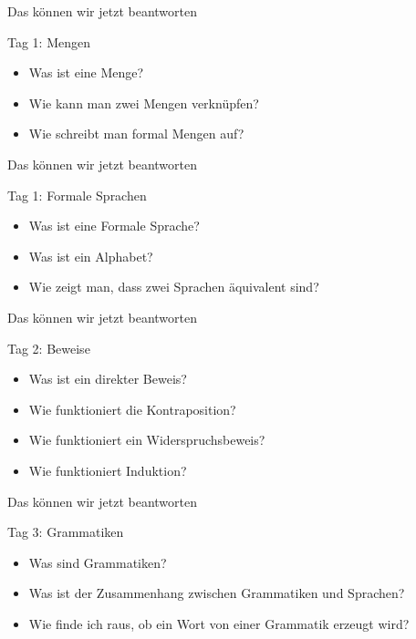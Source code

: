 \begin{frame}[fragile]{Das können wir jetzt beantworten}
	\begin{alertblock}{Tag 1: Mengen}
		\begin{itemize}
			\item Was ist eine Menge?
			\item Wie kann man zwei Mengen verknüpfen?
			\item Wie schreibt man formal Mengen auf?
		\end{itemize}
	\end{alertblock}
\end{frame}

\begin{frame}[fragile]{Das können wir jetzt beantworten}
	\begin{alertblock}{Tag 1: Formale Sprachen}
		\begin{itemize}
			\item Was ist eine Formale Sprache?
			\item Was ist ein Alphabet?
			\item Wie zeigt man, dass zwei Sprachen äquivalent sind?
		\end{itemize}
	\end{alertblock}
\end{frame}

\begin{frame}[fragile]{Das können wir jetzt beantworten}
    \begin{alertblock}{Tag 2: Beweise}
    \begin{itemize}
        \item Was ist ein direkter Beweis?
        \item Wie funktioniert die Kontraposition?
        \item Wie funktioniert ein Widerspruchsbeweis?
        \item Wie funktioniert Induktion?
    \end{itemize}
    \end{alertblock}
\end{frame}

\begin{frame}[fragile]{Das können wir jetzt beantworten}
    \begin{alertblock}{Tag 3: Grammatiken}
    \begin{itemize}
        \item Was sind Grammatiken?
        \item Was ist der Zusammenhang zwischen Grammatiken und Sprachen?
        \item Wie finde ich raus, ob ein Wort von einer Grammatik erzeugt wird?
    \end{itemize}
    \end{alertblock}
\end{frame}